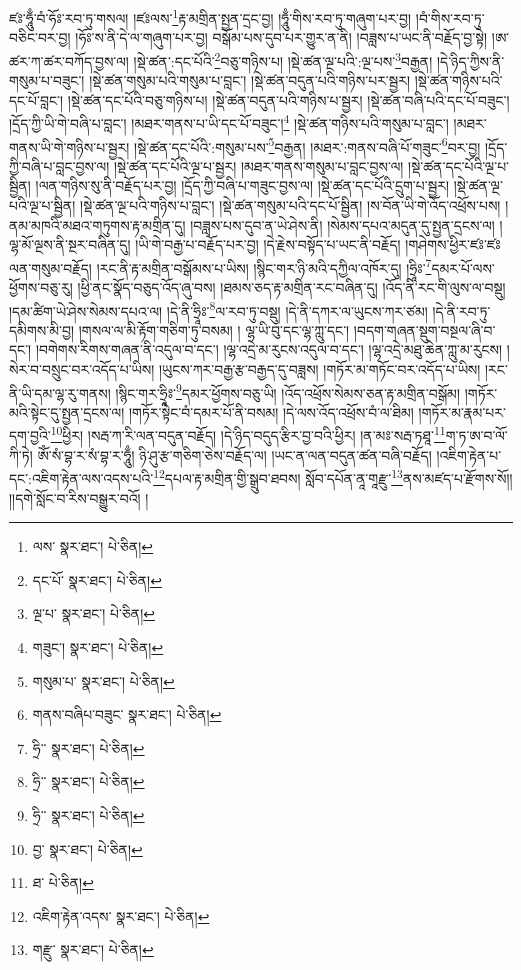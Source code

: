 ཛཿ་ཧཱུྃ་བཾ་ཧོཿ་རབ་ཏུ་གསལ། །ཛཿལས་\footnote{ལས་  སྣར་ཐང་།  པེ་ཅིན། }རྟ་མགྲིན་སྤྱན་དྲང་བྱ། །ཧཱུྃ་གིས་རབ་ཏུ་གཞུག་པར་བྱ། །བཾ་གིས་རབ་ཏུ་བཅིང་བར་བྱ། །ཧོཿ་ས་ནི་དེ་ལ་གཞུག་པར་བྱ། བསྒོམ་པས་དུབ་པར་གྱུར་ན་ནི། །བཟླས་པ་ཡང་ནི་བརྗོད་བྱ་སྟེ། །ཨ་ཚར་ཀ་ཚར་བཀོད་བྱས་ལ། །སྡེ་ཚན་:དང་པོའི་\footnote{དང་པོ་  སྣར་ཐང་།  པེ་ཅིན། }བཅུ་གཉིས་པ། །སྡེ་ཚན་ལྔ་པའི་:ལྔ་པས་\footnote{ལྔ་པ་  སྣར་ཐང་།  པེ་ཅིན། }བརྒྱན། །དེ་ཉིད་ཀྱིས་ནི་གསུམ་པ་བཟུང་། །སྡེ་ཚན་གསུམ་པའི་གསུམ་པ་བླང་། །སྡེ་ཚན་བདུན་པའི་གཉིས་པར་སྦྱར། །སྡེ་ཚན་གཉིས་པའི་དང་པོ་བླང་། །སྡེ་ཚན་དང་པོའི་བཅུ་གཉིས་པ། །སྡེ་ཚན་བདུན་པའི་གཉིས་པ་སྦྱར། །སྡེ་ཚན་བཞི་པའི་དང་པོ་བཟུང་། །དྲོད་ཀྱི་ཡི་གེ་བཞི་པ་བླང་། །མཐར་གནས་པ་ཡི་དང་པོ་བཟུང་།\footnote{གཟུང་།  སྣར་ཐང་།  པེ་ཅིན། } །སྡེ་ཚན་གཉིས་པའི་གསུམ་པ་བླང་། །མཐར་གནས་ཡི་གེ་གཉིས་པ་སྦྱར། །སྡེ་ཚན་དང་པོའི་:གསུམ་པས་\footnote{གསུམ་པ་  སྣར་ཐང་།  པེ་ཅིན། }བརྒྱན། །མཐར་:གནས་བཞི་པོ་གཟུང་\footnote{གནས་བཞིཔ་བཟུང་  སྣར་ཐང་།  པེ་ཅིན། }བར་བྱ། །དྲོད་ཀྱི་བཞི་པ་བླང་བྱས་ལ། །སྡེ་ཚན་དང་པོའི་ལྔ་པ་སྦྱར། །མཐར་གནས་གསུམ་པ་བླང་བྱས་ལ། །སྡེ་ཚན་དང་པོའི་ལྔ་པ་སྦྱིན། །ལན་གཉིས་སུ་ནི་བརྗོད་པར་བྱ། །དྲོད་ཀྱི་བཞི་པ་གཟུང་བྱས་ལ། །སྡེ་ཚན་དང་པོའི་དྲུག་པ་སྦྱར། །སྡེ་ཚན་ལྔ་པའི་ལྔ་པ་སྦྱིན། །སྡེ་ཚན་ལྔ་པའི་གཉིས་པ་བླང་། །སྡེ་ཚན་གསུམ་པའི་དང་པོ་སྦྱིན། །ས་བོན་ཡི་གེ་འོད་འཕྲོས་པས། །ནམ་མཁའི་མཐའ་གཏུགས་རྟ་མགྲིན་དུ། །བཟླས་པས་དུབ་ན་ཡེ་ཤེས་ནི། །སེམས་དཔའ་མདུན་དུ་སྤྱན་དྲངས་ལ། །ལྷ་མོ་ལྔས་ནི་སྔར་བཞིན་དུ། །ཡི་གེ་བརྒྱ་པ་བརྗོད་པར་བྱ། །དེ་རྗེས་བསྟོད་པ་ཡང་ནི་བརྗོད། །གཤེགས་ཕྱིར་ཛཿ་ཛཿལན་གསུམ་བརྗོད། །རང་ནི་རྟ་མགྲིན་བསྒོམས་པ་ཡིས། །སྙིང་གར་ཉི་མའི་དཀྱིལ་འཁོར་དུ། །ཧྲཱིཿ་\footnote{ཧྲི་་  སྣར་ཐང་།  པེ་ཅིན། }དམར་པོ་ལས་ཕྱོགས་བཅུ་རུ། །ཕྱི་ནང་སྣོད་བཅུད་འོད་ཞུ་བས། །ཐམས་ཅད་རྟ་མགྲིན་རང་བཞིན་དུ། །འོད་ནི་རང་གི་ལུས་ལ་བསྡུ། །དམ་ཚིག་ཡེ་ཤེས་སེམས་དཔའ་ལ། །དེ་ནི་ཧྲཱིཿ་\footnote{ཧྲི་་  སྣར་ཐང་།  པེ་ཅིན། }ལ་རབ་ཏུ་བསྡུ། །དེ་ནི་དཀར་ལ་ཡུངས་ཀར་ཙམ། །དེ་ནི་རབ་ཏུ་དམིགས་མི་བྱ། །གསལ་ལ་མི་རྟོག་གཅིག་ཏུ་བསམ། །
ལྷ་ཡི་བུ་དང་ལྷ་ཀླུ་དང་། །བདག་གཞན་སྡུག་བསྔལ་ཞི་བ་དང་། །བགེགས་རིགས་གཞན་ནི་འདུལ་བ་དང་། །ལྷ་འདྲེ་མ་རུངས་འདུལ་བ་དང་། །ལྷ་འདྲེ་མཐུ་ཆེན་ཀླུ་མ་རུངས། །སེར་བ་བསྲུང་བར་འདོད་པ་ཡིས། །ཡུངས་ཀར་བརྒྱ་རྩ་བརྒྱད་དུ་བཟླས། །གཏོར་མ་གཏོང་བར་འདོད་པ་ཡིས། །རང་ནི་ཡི་དམ་ལྷ་རུ་གནས། །སྙིང་གར་ཧྲཱིཿ་\footnote{ཧྲི་་  སྣར་ཐང་།  པེ་ཅིན། }དམར་ཕྱོགས་བཅུ་ཡི། །འོད་འཕྲོས་སེམས་ཅན་རྟ་མགྲིན་བསྒོམ། །གཏོར་མའི་སྟེང་དུ་སྤྱན་དྲངས་ལ། །གཏོར་སྟེང་བཾ་དམར་པོ་ནི་བསམ། །དེ་ལས་འོད་འཕྲོས་བཾ་ལ་ཐིམ། །གཏོར་མ་རྣམ་པར་དག་བྱའི་\footnote{བྱ་  སྣར་ཐང་།  པེ་ཅིན། }ཕྱིར། །སརྦ་ཀ་རི་ལན་བདུན་བརྗོད། །དེ་ཉིད་བདུད་རྩིར་བྱ་བའི་ཕྱིར། །ན་མཿ་སརྦ་ཏཐཱ་\footnote{ཐ་  པེ་ཅིན། }ག་ཏ་ཨ་བ་ལོ་ཀི་ཏེ། ཨོཾ་སཾ་བྷ་ར་སཾ་བྷ་ར་ཧཱུྃ། ཉི་ཤུ་རྩ་གཅིག་ཅེས་བརྗོད་ལ། །ཡང་ན་ལན་བདུན་ཚན་བཞི་བརྗོད། །འཇིག་རྟེན་པ་དང་:འཇིག་རྟེན་ལས་འདས་པའི་\footnote{འཇིག་རྟེན་འདས་  སྣར་ཐང་།  པེ་ཅིན། }དཔལ་རྟ་མགྲིན་གྱི་སྒྲུབ་ཐབས། སློབ་དཔོན་ནཱ་གཱརྫུ་\footnote{གརྫུ་  སྣར་ཐང་།  པེ་ཅིན། }ནས་མཛད་པ་རྫོགས་སོ།། །།དགེ་སློང་བ་རིས་བསྒྱུར་བའོ། ། 